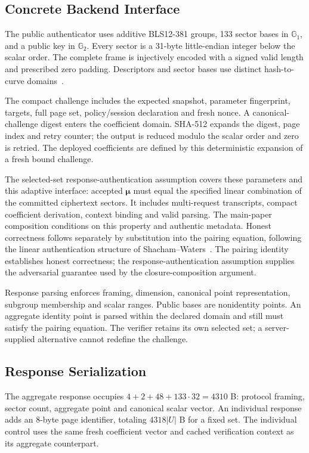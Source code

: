 \documentclass[10pt,journal,onecolumn]{IEEEtran}
\begin{document}
\subsection{Concrete Backend Interface}\label{sec:backend-interface}
The public authenticator uses additive BLS12-381 groups, 133 sector bases
in $\mathbb G_1$, and a public key in $\mathbb G_2$. Every sector is a
31-byte little-endian integer below the scalar order. The complete frame
is injectively encoded with a signed valid length and prescribed zero padding.
Descriptors and sector bases use distinct hash-to-curve domains~\cite{RFC9380}.

The compact challenge includes the expected snapshot, parameter fingerprint,
targets, full page set, policy/session declaration and fresh nonce.
A canonical-challenge digest enters the coefficient domain. SHA-512 expands
the digest, page index and retry counter; the output is reduced modulo the
scalar order and zero is retried. The deployed coefficients are defined by
this deterministic expansion of a fresh bound challenge.

The selected-set response-authentication assumption covers these parameters and this
adaptive interface: accepted $\boldsymbol\mu$ must equal the specified
linear combination of the committed ciphertext sectors. It includes
multi-request transcripts, compact coefficient derivation, context binding
and valid parsing. The main-paper composition conditions on this property
and authentic metadata. Honest correctness follows separately by substitution
into the pairing equation, following the linear authentication structure
of Shacham--Waters~\cite{ShachamWaters2013}. The pairing identity establishes
honest correctness; the response-authentication assumption supplies the
adversarial guarantee used by the closure-composition argument.

Response parsing enforces framing, dimension, canonical point representation,
subgroup membership and scalar ranges. Public bases are nonidentity points.
An aggregate identity point is parsed within the declared domain and still
must satisfy the pairing equation. The verifier retains its own selected
set; a server-supplied alternative cannot redefine the challenge.

\subsection{Response Serialization}\label{sec:wire-format}
The aggregate response occupies $4+2+48+133\cdot32=4310$ B: protocol framing,
sector count, aggregate point and canonical scalar vector. An individual
response adds an 8-byte page identifier, totaling $4318|U|$ B for a fixed set.
The individual control uses the same fresh coefficient vector and cached
verification context as its aggregate counterpart.
\end{document}

